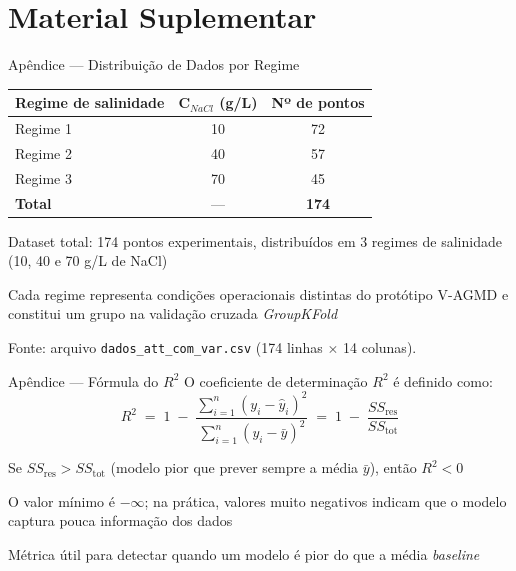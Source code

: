 \section{Material Suplementar}

\begin{slide}{Apêndice — Distribuição de Dados por Regime}
  \centering
  \footnotesize
  \begin{tabular}{lcc}
    \toprule
    \textbf{Regime de salinidade} & \textbf{C$_{NaCl}$ (g/L)} & \textbf{Nº de pontos} \\
    \midrule
    Regime 1 & 10 & 72 \\
    Regime 2 & 40 & 57 \\
    Regime 3 & 70 & 45 \\
    \midrule
    \textbf{Total} & --- & \textbf{174} \\
    \bottomrule
  \end{tabular}
  \vfill
  \begin{Item}[0.10]
    \item Dataset total: 174 pontos experimentais, distribuídos em 3 regimes de salinidade (10, 40 e 70 g/L de NaCl)
    \item Cada regime representa condições operacionais distintas do protótipo V-AGMD e constitui um grupo na validação cruzada \textit{GroupKFold}
  \end{Item}
  \vfill
  {\scriptsize Fonte: arquivo \texttt{dados\_att\_com\_var.csv} (174 linhas $\times$ 14 colunas).}
\end{slide}

\begin{slide}{Apêndice — Fórmula do $R^2$}
  \centering
  \footnotesize
  O coeficiente de determinação $R^2$ é definido como:
  \[
    R^2 \;=\; 1 \;-\; \frac{\sum_{i=1}^{n}(y_i - \hat{y}_i)^2}{\sum_{i=1}^{n}(y_i - \bar{y})^2}
    \;=\; 1 \;-\; \frac{SS_{\mathrm{res}}}{SS_{\mathrm{tot}}}
  \]
  \vfill
  \begin{Item}[0.12]
    \item Se $SS_{\mathrm{res}} > SS_{\mathrm{tot}}$ (modelo pior que prever sempre a média $\bar{y}$), então $R^2 < 0$
    \item O valor mínimo é $-\infty$; na prática, valores muito negativos indicam que o modelo captura pouca informação dos dados
    \item Métrica útil para detectar quando um modelo é pior do que a média \textit{baseline} \cite{sklearn_r2}
  \end{Item}
\end{slide}


